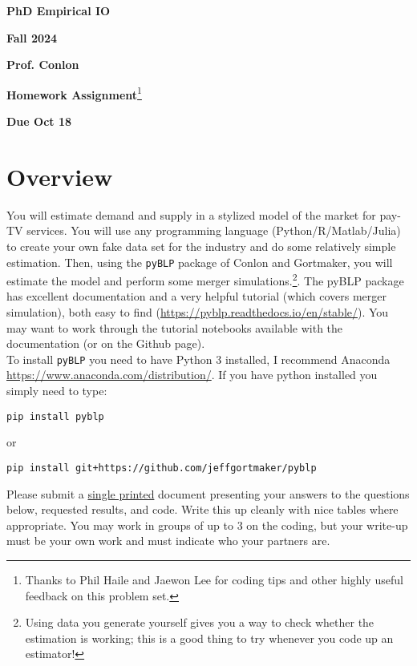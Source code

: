 \documentclass[english,11pt]{article}
\begin{document}
\begin{center}
\textbf{PhD Empirical IO}

\textbf{Fall 2024}

\textbf{Prof. Conlon}

\textbf{Homework Assignment}\footnote{Thanks to Phil Haile and Jaewon Lee for coding tips and other highly useful feedback on this problem set.}


\textbf{Due Oct 18}
\end{center}

\bigskip

\section*{Overview}

You will estimate demand and supply in a stylized model of the market for
pay-TV services. You will use any programming language (Python/R/Matlab/Julia) to create your own fake data set for the industry and do some
relatively simple estimation. Then, using the \texttt{pyBLP} package of Conlon and Gortmaker, you will
estimate the model and perform some merger simulations.\footnote{%
Using data you generate yourself gives you a way to check whether the
estimation is working; this is a good thing to try whenever you code up an
estimator!}. The pyBLP package has excellent
documentation and a very helpful tutorial (which covers merger simulation),
both easy to find (\url{https://pyblp.readthedocs.io/en/stable/}). You may want to work through the tutorial notebooks available with the documentation (or on the Github page).\\


To install \texttt{pyBLP} you need to have Python 3 installed, I recommend Anaconda \url{https://www.anaconda.com/distribution/}. If you have python installed you simply need to type:
\begin{verbatim}
pip install pyblp
\end{verbatim}
or 
\begin{verbatim}
pip install git+https://github.com/jeffgortmaker/pyblp
\end{verbatim}

Please submit a \underline{single printed} document presenting your answers to the questions below,
requested results, and code. Write this up cleanly with nice tables where appropriate.
You may work in groups of up to 3 on the coding, but your write-up must be your own work and must indicate who your partners are.
\end{document}
